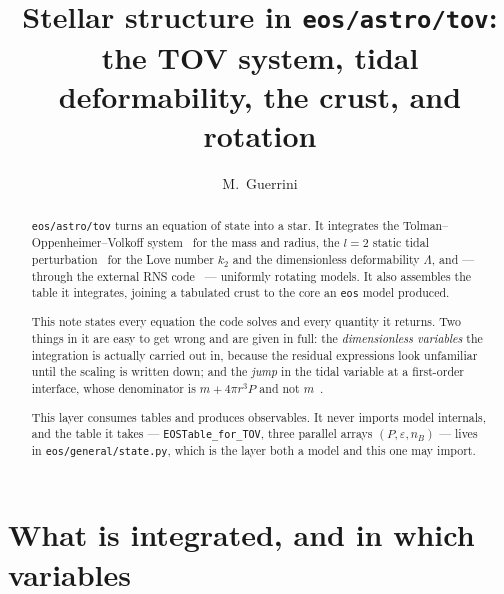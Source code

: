 \documentclass[aps,prc,onecolumn,superscriptaddress,nofootinbib,10pt]{revtex4-2}
\newcommand{\nB}{n_B}
\begin{document}
\title{Stellar structure in \texttt{eos/astro/tov}: \\
       the TOV system, tidal deformability, the crust, and rotation}

\author{M.~Guerrini}

\begin{abstract}
\texttt{eos/astro/tov} turns an equation of state into a star. It integrates
the Tolman--Oppenheimer--Volkoff
system~\cite{Tolman1939,OppenheimerVolkoff1939} for the mass and radius, the
$l = 2$ static tidal perturbation~\cite{Hinderer2008,DamourNagar2009} for the
Love number $k_2$ and the dimensionless deformability $\Lambda$, and --- through
the external RNS code~\cite{StergioulasFriedman1995} --- uniformly rotating
models. It also assembles the table it integrates, joining a tabulated crust to
the core an \texttt{eos} model produced.

This note states every equation the code solves and every quantity it returns.
Two things in it are easy to get wrong and are given in full: the
\emph{dimensionless variables} the integration is actually carried out in,
because the residual expressions look unfamiliar until the scaling is written
down; and the \emph{jump} in the tidal variable at a first-order interface,
whose denominator is $m + 4\pi r^3 P$ and not $m$~\cite{TakatsyKovacs2020}.

This layer consumes tables and produces observables. It never imports model
internals, and the table it takes --- \texttt{EOSTable\_for\_TOV}, three parallel
arrays $(P, \varepsilon, \nB)$ --- lives in \texttt{eos/general/state.py},
which is the layer both a model and this one may import.
\end{abstract}

\maketitle

\section{What is integrated, and in which variables}
\label{sec:units}
\end{document}
